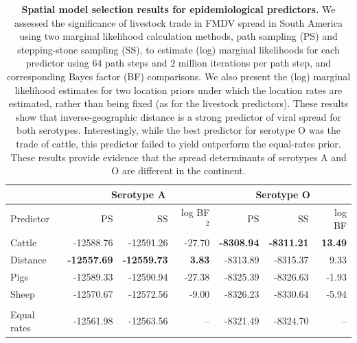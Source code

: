 \documentclass[10pt]{article}
\begin{document}
\begin{table}[H]
\caption{
\textbf{Spatial model selection results for epidemiological predictors.}
We assessed the significance of livestock trade in FMDV spread in South America using two marginal likelihood calculation methods, path sampling (PS) and stepping-stone sampling (SS), to estimate (log) marginal likelihoods for each predictor using $64$ path steps and $2$ million iterations per path step, and corresponding Bayes factor (BF) comparisons.
We also present the (log) marginal likelihood estimates for two location priors under which the location rates are estimated, rather than being fixed (as for the livestock predictors).
These results show that inverse-geographic distance is a strong predictor of viral spread for both serotypes.
Interestingly, while the best predictor for serotype O was the trade of cattle, this predictor failed to yield outperform the equal-rates prior.
These results provide evidence that the spread determinants of serotypes A and O are different in the continent.
}
\begin{center}
\begin{tabular}{lrrrrrr}
\toprule
 & \multicolumn{3}{c}{Serotype A}& \multicolumn{3}{c}{Serotype O}\\
 \midrule
Predictor & PS & SS & log BF$^2$ & PS & SS & log BF \\
Cattle&-12588.76&-12591.26&-27.70&\textbf{-8308.94}&\textbf{-8311.21}& \textbf{13.49}\\
Distance&\textbf{-12557.69}&\textbf{-12559.73}&\textbf{3.83}&-8313.89&-8315.37&9.33\\
Pigs&-12589.33&-12590.94&-27.38&-8325.39&-8326.63&-1.93\\
Sheep&-12570.67&-12572.56&-9.00&-8326.23&-8330.64&-5.94\\
\\
\hline
Equal rates &-12561.98&-12563.56&--&-8321.49&-8324.70&--\\
\bottomrule
\end{tabular}
\end{center}
\begin{flushleft}
\end{flushleft}
\label{tab:preds}
 \end{table}
\newpage
\end{document}
